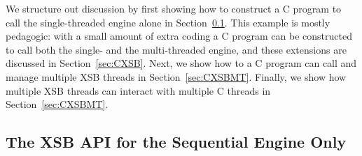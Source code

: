We structure out discussion by first showing how to construct a C
program to call the single-threaded engine alone in
Section~\ref{sec:CXSBSeq}.  This example is mostly pedagogic: with a
small amount of extra coding a C program can be constructed to call
both the single- and the multi-threaded engine, and these extensions
are discussed in Section~\ref{sec:CXSB}.  Next, we show how to a C
program can call and manage multiple XSB threads in Section~\ref{sec:CXSBMT}.
Finally, we show how multiple XSB threads can interact with multiple C
threads in Section~\ref{sec:CXSBMT}.

\subsection{The XSB API for the Sequential Engine Only} \label{sec:CXSBSeq}

